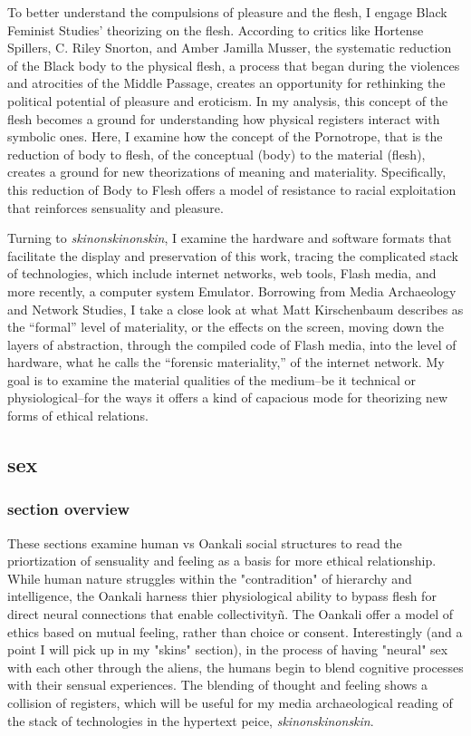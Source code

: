 \documentclass[11pt]{article}
\begin{document}
To better understand the compulsions of pleasure and the flesh, I
engage Black Feminist Studies’ theorizing on the flesh. According to
critics like Hortense Spillers, C. Riley Snorton, and Amber Jamilla
Musser, the systematic reduction of the Black body to the physical
flesh, a process that began during the violences and atrocities of the
Middle Passage, creates an opportunity for rethinking the political
potential of pleasure and eroticism. In my analysis, this concept of
the flesh becomes a ground for understanding how physical registers
interact with symbolic ones. Here, I examine how the concept of the
Pornotrope, that is the reduction of body to flesh, of the conceptual
(body) to the material (flesh), creates a ground for new theorizations
of meaning and materiality. Specifically, this reduction of Body to
Flesh offers a model of resistance to racial exploitation that
reinforces sensuality and pleasure.

Turning to \emph{skinonskinonskin}, I examine the hardware and software
formats that facilitate the display and preservation of this work,
tracing the complicated stack of technologies, which include internet
networks, web tools, Flash media, and more recently, a computer system
Emulator. Borrowing from Media Archaeology and Network Studies, I take
a close look at what Matt Kirschenbaum describes as the “formal” level
of materiality, or the effects on the screen, moving down the layers
of abstraction, through the compiled code of Flash media, into the
level of hardware, what he calls the “forensic materiality,” of the
internet network. My goal is to examine the material qualities of the
medium--be it technical or physiological--for the ways it offers a
kind of capacious mode for theorizing new forms of ethical relations.

\subsection{sex}
\label{sec:orga4fb3d7}
\subsubsection{section overview}
\label{sec:orge0a3d05}
These sections examine human vs Oankali social structures to read the
priortization of sensuality and feeling as a basis for more ethical
relationship. While human nature struggles within the "contradition"
of hierarchy and intelligence, the Oankali harness thier physiological
ability to bypass flesh for direct neural connections that enable
collectivityñ. The Oankali offer a model of ethics based on mutual
feeling, rather than choice or consent. Interestingly (and a point I
will pick up in my "skins" section), in the process of having "neural"
sex with each other through the aliens, the humans begin to blend
cognitive processes with their sensual experiences. The blending of
thought and feeling shows a collision of registers, which will be
useful for my media archaeological reading of the stack of
technologies in the hypertext peice, \emph{skinonskinonskin}.
\end{document}
